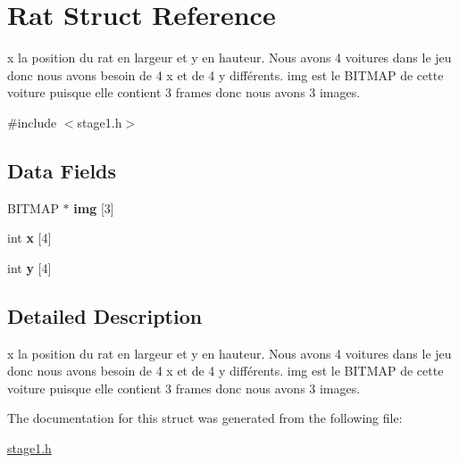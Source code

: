 \hypertarget{struct_rat}{\section{Rat Struct Reference}
\label{struct_rat}
}


x la position du rat en largeur et y en hauteur. Nous avons 4 voitures dans le jeu donc nous avons besoin de 4 x et de 4 y différents. img est le B\-I\-T\-M\-A\-P de cette voiture puisque elle contient 3 frames donc nous avons 3 images.  




{\ttfamily \#include $<$stage1.\-h$>$}

\subsection*{Data Fields}
\begin{DoxyCompactItemize}
\item 
\hypertarget{struct_rat_a99933deee119efe612d38cf6759af35e}{B\-I\-T\-M\-A\-P $\ast$ {\bfseries img} \mbox{[}3\mbox{]}}\label{struct_rat_a99933deee119efe612d38cf6759af35e}

\item 
\hypertarget{struct_rat_ab497c9cc64d8241f54bee95e694ff756}{int {\bfseries x} \mbox{[}4\mbox{]}}\label{struct_rat_ab497c9cc64d8241f54bee95e694ff756}

\item 
\hypertarget{struct_rat_afbc004b650e7331b8b87243a689dc765}{int {\bfseries y} \mbox{[}4\mbox{]}}\label{struct_rat_afbc004b650e7331b8b87243a689dc765}

\end{DoxyCompactItemize}


\subsection{Detailed Description}
x la position du rat en largeur et y en hauteur. Nous avons 4 voitures dans le jeu donc nous avons besoin de 4 x et de 4 y différents. img est le B\-I\-T\-M\-A\-P de cette voiture puisque elle contient 3 frames donc nous avons 3 images. 


\begin{DoxyItemize}
\item 
\end{DoxyItemize}

The documentation for this struct was generated from the following file\-:\begin{DoxyCompactItemize}
\item 
\hyperlink{stage1_8h}{stage1.\-h}\end{DoxyCompactItemize}
